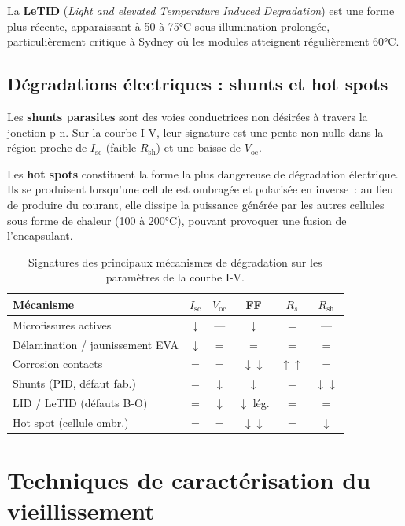 \documentclass[12pt,a4paper]{report}
\begin{document}
La \textbf{LeTID} (\textit{Light and elevated Temperature Induced Degradation}) est une forme plus récente, apparaissant à 50 à 75°C sous illumination prolongée, particulièrement critique à Sydney où les modules atteignent régulièrement 60°C.

\subsection{Dégradations électriques : shunts et hot spots}

Les \textbf{shunts parasites} sont des voies conductrices non désirées à travers la jonction p-n. Sur la courbe I-V, leur signature est une pente non nulle dans la région proche de $I_\text{sc}$ (faible $R_\text{sh}$) et une baisse de $V_\text{oc}$.

Les \textbf{hot spots} constituent la forme la plus dangereuse de dégradation électrique. Ils se produisent lorsqu'une cellule est ombragée et polarisée en inverse~: au lieu de produire du courant, elle dissipe la puissance générée par les autres cellules sous forme de chaleur (100 à 200°C), pouvant provoquer une fusion de l'encapsulant.

\begin{table}[H]
\centering
\caption{Signatures des principaux mécanismes de dégradation sur les paramètres de la courbe I-V.}
\label{tab:degradation}
\small
\begin{tabularx}{\textwidth}{Xccccc}
\toprule
Mécanisme & $I_\text{sc}$ & $V_\text{oc}$ & FF & $R_s$ & $R_\text{sh}$ \\
\midrule
Microfissures actives & $\downarrow$ & --- & $\downarrow$ & = & --- \\
Délamination / jaunissement EVA & $\downarrow$ & = & = & = & = \\
Corrosion contacts & = & = & $\downarrow\downarrow$ & $\uparrow\uparrow$ & = \\
Shunts (PID, défaut fab.) & = & $\downarrow$ & $\downarrow$ & = & $\downarrow\downarrow$ \\
LID / LeTID (défauts B-O) & = & $\downarrow$ & $\downarrow$ lég. & = & = \\
Hot spot (cellule ombr.) & = & = & $\downarrow\downarrow$ & = & $\downarrow$ \\
\bottomrule
\end{tabularx}
\end{table}

\section{Techniques de caractérisation du vieillissement}
\end{document}
